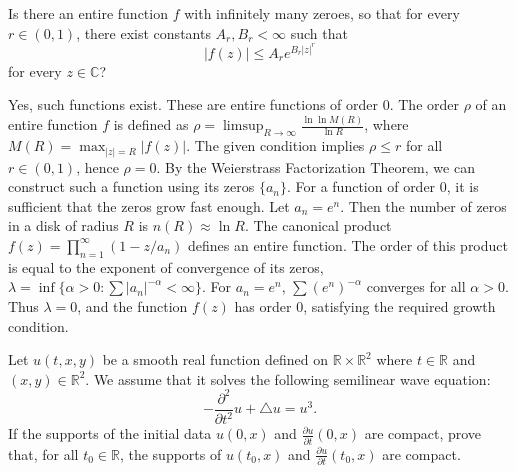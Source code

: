 \begin{exercise}
\label{analysis:2019:9}
Is there an entire function $f$ with infinitely many zeroes, so that for every $r\in(0,1)$, there exist constants $A_r,B_r<\infty$ such that
\[
|f(z)| \leq A_r e^{B_r|z|^r}
\]
for every $z\in\mathbb{C}$?
\end{exercise}

\begin{solution}
Yes, such functions exist. These are entire functions of order 0. The order $\rho$ of an entire function $f$ is defined as $\rho = \limsup_{R \to \infty} \frac{\ln \ln M(R)}{\ln R}$, where $M(R) = \max_{|z|=R} |f(z)|$. The given condition implies $\rho \leq r$ for all $r \in (0, 1)$, hence $\rho = 0$.
By the Weierstrass Factorization Theorem, we can construct such a function using its zeros $\{a_n\}$. For a function of order 0, it is sufficient that the zeros grow fast enough. Let $a_n = e^n$. Then the number of zeros in a disk of radius $R$ is $n(R) \approx \ln R$.
The canonical product $f(z) = \prod_{n=1}^\infty (1 - z/a_n)$ defines an entire function. The order of this product is equal to the exponent of convergence of its zeros, $\lambda = \inf \{ \alpha > 0 : \sum |a_n|^{-\alpha} < \infty \}$.
For $a_n = e^n$, $\sum (e^n)^{-\alpha}$ converges for all $\alpha > 0$. Thus $\lambda = 0$, and the function $f(z)$ has order 0, satisfying the required growth condition.
\end{solution}

\begin{exercise}
\label{analysis:2019:10}
Let $u(t,x,y)$ be a smooth real function defined on $\mathbb{R}\times\mathbb{R}^2$ where $t\in\mathbb{R}$ and $(x,y)\in\mathbb{R}^2$. We assume that it solves the following semilinear wave equation:
\[
-\frac{\partial^2}{\partial t^2}u + \triangle u = u^3.
\]
If the supports of the initial data $u(0,x)$ and $\frac{\partial u}{\partial t}(0,x)$ are compact, prove that, for all $t_0\in\mathbb{R}$, the supports of $u(t_0,x)$ and $\frac{\partial u}{\partial t}(t_0,x)$ are compact.
\end{exercise}

